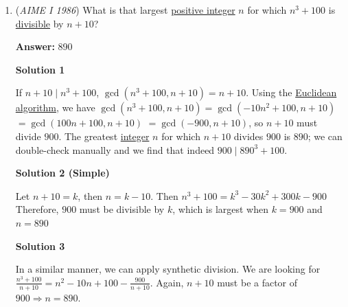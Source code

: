 \begin{enumerate}
\textbf{Solution 2}

Subtracting the first equation from every one of the other equations yields
 \begin{align*} x_2-x_1&=6\\ x_3-x_1&=18\\ x_4-x_1&=42\\ x_5-x_1&=90 \end{align*}
Thus
 \begin{align*} 2x_1+x_2+x_3+x_4+x_5&=6\\ 2x_1+(x_1+6)+(x_1+18)+(x_1+42)+(x_1+90)&=6\\ 6x_1+156&=6\\ x_1&=-25 \end{align*}
Using the previous equations,
 \[3x_4+2x_5=3(x_1+42)+2(x_1+90)=\boxed{181}\]



	\item (\textit{AIME I 1986}) What is that largest \href{https://artofproblemsolving.com/wiki/index.php?title=Positive\_integer}{positive integer} $n$ for which $n^3+100$ is \href{https://artofproblemsolving.com/wiki/index.php?title=Divisible}{divisible} by $n+10$?


 
 \textbf{Answer: }890



\textbf{Solution 1}

If $n+10 \mid n^3+100$, $\gcd(n^3+100,n+10)=n+10$. Using the \href{https://artofproblemsolving.com/wiki/index.php?title=Euclidean\_algorithm}{Euclidean algorithm}, we have $\gcd(n^3+100,n+10)= \gcd(-10n^2+100,n+10)$ $= \gcd(100n+100,n+10)$ $= \gcd(-900,n+10)$, so $n+10$ must divide $900$. The greatest \href{https://artofproblemsolving.com/wiki/index.php?title=Integer}{integer} $n$ for which $n+10$ divides $900$ is $\boxed{890}$; we can double-check manually and we find that indeed $900\mid 890^3+100$.

 



\textbf{Solution 2 (Simple)}

Let $n+10=k$, then $n=k-10$. Then $n^3+100 = k^3-30k^2+300k-900$ Therefore, $900$ must be divisible by $k$, which is largest when $k=900$ and $n=\boxed{890}$




\textbf{Solution 3}

In a similar manner, we can apply synthetic division. We are looking for $\frac{n^3 + 100}{n + 10} = n^2 - 10n + 100 - \frac{900}{n + 10}$. Again, $n + 10$ must be a factor of $900 \Longrightarrow n = \boxed{890}$.


\end{enumerate}
